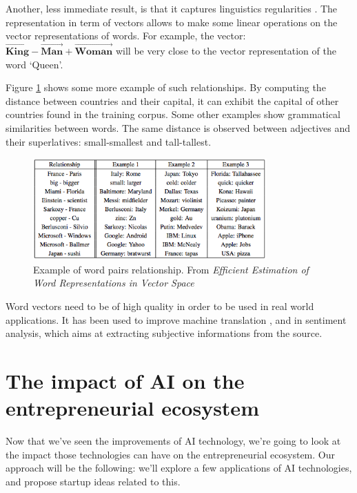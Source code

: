 \documentclass[12pt]{article}
\begin{document}
Another, less immediate result, is that it captures linguistics regularities
\cite{continuousWordVec}. The representation in term of vectors allows to make
some linear operations on the vector representations of words. For example,
the vector: $\vec{\textbf{King}} - \vec{\textbf{Man}} + \vec{\textbf{Woman}}$ will be very close to the vector
representation of the word \lq Queen\rq.

Figure \ref{fig:wordpair} shows some more example of such relationships. By
computing  the distance between countries and their capital, it can exhibit the
capital of other countries found in the training corpus. Some other examples
show grammatical similarities between words. The same distance is observed
between adjectives and their superlatives: small-smallest and tall-tallest.


\begin{figure}[ht]
    \centering
    \includegraphics[width=0.8\textwidth]{vectors}
    \caption{Example of word pairs relationship. From {\em Efficient Estimation of Word Representations in
    Vector Space} \cite{wordVec}}
    \label{fig:wordpair}
\end{figure}

Word vectors need to be of high quality in order to be used in real world applications.
It has been used to improve machine translation \cite{translation}, and in sentiment analysis, which aims
at extracting subjective informations from the source.\cite{sentiment}


\pagebreak


\section{The impact of AI on the entrepreneurial ecosystem}

Now that we've seen the improvements of AI technology, we're going to look at
the impact those technologies can have on the entrepreneurial ecosystem.
Our approach will be the following: we'll explore a few applications of AI
technologies, and propose startup ideas related to this.
\end{document}
